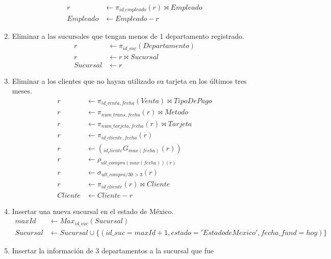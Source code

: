 \documentclass{article}
\begin{document}
\begin{enumerate}
{\begin{align*}
                r &\leftarrow \pi_{id\_empleado}(r) \bowtie Empleado \\
                Empleado &\leftarrow Empleado - r
            \end{align*}
        }
        \item {
            Eliminar a las sucursales que tengan menos de 1 departamento
            registrado.
            \begin{align*}
                r &\leftarrow \pi_{id\_suc}(Departamento)\\
                r &\leftarrow r \bowtie Sucursal \\
                Sucursal &\leftarrow r
            \end{align*}
        }
        \item {
            Eliminar a los clientes que no hayan utilizado su tarjeta en los
            últimos tres meses.
            \begin{align*}
                r &\leftarrow \pi_{id\_venta, fecha}(Venta) \bowtie TipoDePago \\
                r &\leftarrow \pi_{num\_trans, fecha}(r) \bowtie Metodo \\
                r &\leftarrow \pi_{num\_tarjeta, fecha}(r) \bowtie Tarjeta \\
                r &\leftarrow \pi_{id\_cliente, fecha}(r) \\
                r &\leftarrow (_{id_cliente}G_{max(fecha)}(r)) \\
                r &\leftarrow \rho_{ult\_compra(max(fecha))(r)} \\
                r &\leftarrow \sigma_{ult\_compra/30 > 3}(r) \\
                r &\leftarrow \pi_{id\_cliente}(r) \bowtie Cliente \\
                Cliente &\leftarrow Cliente - r
            \end{align*}
        }
        \item {
            Insertar una nueva sucursal en el estado de México.
            \begin{align*}
                maxId &\leftarrow Max_{id\_suc}(Sucursal)\\
                Sucursal &\leftarrow Sucursal 
                \cup \{(id\_suc = maxId+1, estado='Estado de Mexico', 
                fecha\_fund = hoy)\}
            \end{align*}
        }
        \item {
            Insertar la información de 3 departamentos a la sucursal que fue
}
\end{enumerate}
\end{document}
